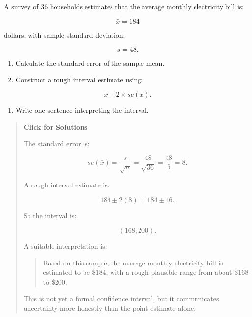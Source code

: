 \documentclass[
  letterpaper,
  DIV=11,
  numbers=noendperiod]{scrreprt}
\providecommand{\tightlist}{%
  \setlength{\itemsep}{0pt}\setlength{\parskip}{0pt}}
\begin{document}
\begin{tcolorbox}[enhanced jigsaw, arc=.35mm, bottomrule=.15mm, bottomtitle=1mm, breakable, colback=white, colbacktitle=quarto-callout-note-color!10!white, colframe=quarto-callout-note-color-frame, coltitle=black, left=2mm, leftrule=.75mm, opacityback=0, opacitybacktitle=0.6, rightrule=.15mm, title=\textcolor{quarto-callout-note-color}{\faInfo}\hspace{0.5em}{Question 4}, titlerule=0mm, toprule=.15mm, toptitle=1mm]

A survey of 36 households estimates that the average monthly electricity
bill is:

\[
\bar{x} = 184
\]

dollars, with sample standard deviation:

\[
s = 48.
\]

\begin{enumerate}
\def\labelenumi{\arabic{enumi}.}
\tightlist
\item
  Calculate the standard error of the sample mean.
\item
  Construct a rough interval estimate using:
\end{enumerate}

\[
\bar{x} \pm 2 \times se(\bar{x}).
\]

\begin{enumerate}
\def\labelenumi{\arabic{enumi}.}
\setcounter{enumi}{2}
\tightlist
\item
  Write one sentence interpreting the interval.
\end{enumerate}

\begin{quote}
\textbf{Click for Solutions}

The standard error is:

\[
se(\bar{x})
=
\frac{s}{\sqrt{n}}
=
\frac{48}{\sqrt{36}}
=
\frac{48}{6}
=
8.
\]

A rough interval estimate is:

\[
184 \pm 2(8)
=
184 \pm 16.
\]

So the interval is:

\[
(168,
200).
\]

A suitable interpretation is:

\begin{quote}
Based on this sample, the average monthly electricity bill is estimated
to be \$184, with a rough plausible range from about \$168 to \$200.
\end{quote}

This is not yet a formal confidence interval, but it communicates
uncertainty more honestly than the point estimate alone.
\end{quote}

\end{tcolorbox}
\end{document}
